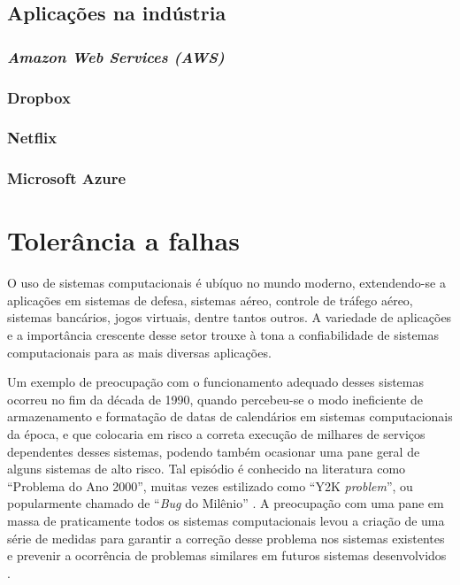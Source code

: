 \documentclass[
	12pt,				%
	openright,			%
	twoside,			%
	a4paper,			%
	english,			%
	french,				%
	spanish,			%
	brazil				%
	]{abntex2}
\begin{document}
\subsection{Aplicações na indústria}

\subsubsection{\emph{Amazon Web Services (AWS)}}

\subsubsection{Dropbox}

\subsubsection{Netflix}

\subsubsection{Microsoft Azure}

\section{Tolerância a falhas}

O uso de sistemas computacionais é ubíquo no mundo moderno, extendendo-se a aplicações em sistemas de defesa, sistemas aéreo, controle de tráfego aéreo, sistemas bancários, jogos virtuais, dentre tantos outros. A variedade de aplicações e a importância crescente desse setor trouxe à tona a confiabilidade de sistemas computacionais para as mais diversas aplicações. \cite{andersonfault}

Um exemplo de preocupação com o funcionamento adequado desses sistemas ocorreu no fim da década de 1990, quando percebeu-se o modo ineficiente de armazenamento e formatação de datas de calendários em sistemas computacionais da época, e que colocaria em risco a correta execução de milhares de serviços dependentes desses sistemas, podendo também ocasionar uma pane geral de alguns sistemas de alto risco. Tal episódio é conhecido na literatura como ``Problema do Ano 2000'', muitas vezes estilizado como ``Y2K \emph{problem}'', ou popularmente chamado de ``\emph{Bug} do Milênio'' . A preocupação com uma pane em massa de praticamente todos os sistemas computacionais levou a criação de uma série de medidas para garantir a correção desse problema nos sistemas existentes e prevenir a ocorrência de problemas similares em futuros sistemas desenvolvidos \cite{petersen1998y2k}.
\end{document}
